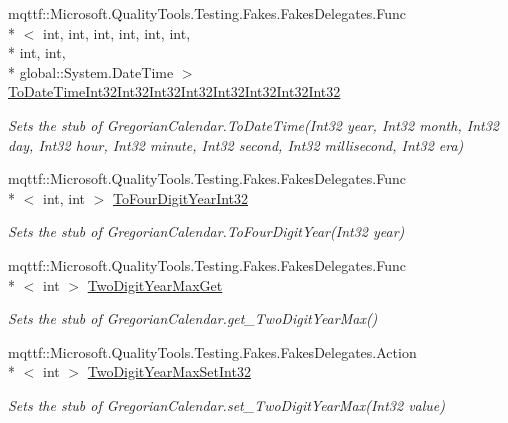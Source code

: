 \begin{DoxyCompactItemize}
mqttf\-::\-Microsoft.\-Quality\-Tools.\-Testing.\-Fakes.\-Fakes\-Delegates.\-Func\\*
$<$ int, int, int, int, int, int, \\*
int, int, \\*
global\-::\-System.\-Date\-Time $>$ \hyperlink{class_system_1_1_globalization_1_1_fakes_1_1_stub_gregorian_calendar_a8480a88d19262852ba782d7efa767594}{To\-Date\-Time\-Int32\-Int32\-Int32\-Int32\-Int32\-Int32\-Int32\-Int32}
\begin{DoxyCompactList}\small\item\em Sets the stub of Gregorian\-Calendar.\-To\-Date\-Time(\-Int32 year, Int32 month, Int32 day, Int32 hour, Int32 minute, Int32 second, Int32 millisecond, Int32 era)\end{DoxyCompactList}\item 
mqttf\-::\-Microsoft.\-Quality\-Tools.\-Testing.\-Fakes.\-Fakes\-Delegates.\-Func\\*
$<$ int, int $>$ \hyperlink{class_system_1_1_globalization_1_1_fakes_1_1_stub_gregorian_calendar_a96a4a928dbcfb2b8dc8045848f0bd15c}{To\-Four\-Digit\-Year\-Int32}
\begin{DoxyCompactList}\small\item\em Sets the stub of Gregorian\-Calendar.\-To\-Four\-Digit\-Year(\-Int32 year)\end{DoxyCompactList}\item 
mqttf\-::\-Microsoft.\-Quality\-Tools.\-Testing.\-Fakes.\-Fakes\-Delegates.\-Func\\*
$<$ int $>$ \hyperlink{class_system_1_1_globalization_1_1_fakes_1_1_stub_gregorian_calendar_a6580218503b01b40c1bd3198062feaf0}{Two\-Digit\-Year\-Max\-Get}
\begin{DoxyCompactList}\small\item\em Sets the stub of Gregorian\-Calendar.\-get\-\_\-\-Two\-Digit\-Year\-Max()\end{DoxyCompactList}\item 
mqttf\-::\-Microsoft.\-Quality\-Tools.\-Testing.\-Fakes.\-Fakes\-Delegates.\-Action\\*
$<$ int $>$ \hyperlink{class_system_1_1_globalization_1_1_fakes_1_1_stub_gregorian_calendar_a568c27760a91e34802c94216b02abc8d}{Two\-Digit\-Year\-Max\-Set\-Int32}
\begin{DoxyCompactList}\small\item\em Sets the stub of Gregorian\-Calendar.\-set\-\_\-\-Two\-Digit\-Year\-Max(\-Int32 value)\end{DoxyCompactList}\end{DoxyCompactItemize}
